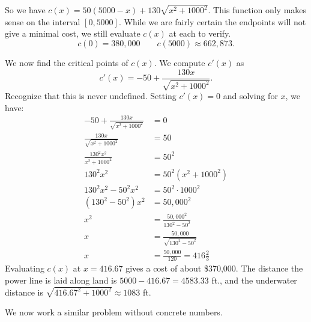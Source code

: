 \documentclass{ximera}
\begin{document}
\begin{example}
\begin{explanation}
    So we have $c(x) = 50(5000-x)+ 130\sqrt{x^2+1000^2}$. This function
    only makes sense on the interval $[0,5000]$. While we are fairly
    certain the endpoints will not give a minimal cost, we still evaluate
    $c(x)$ at each to verify.
    \[
    c(0) = 380,000 \quad\quad c(5000) \approx 662,873.
    \]
    
    We now find the critical points of $c(x)$. We compute $c'(x)$ as
    \[
    c'(x) = -50+\frac{130x}{\sqrt{x^2+1000^2}}.
    \]
    Recognize that this is never undefined. Setting $c'(x)=0$ and solving
    for $x$, we have:
    \begin{align*}
      -50+\frac{130x}{\sqrt{x^2+1000^2}} &= 0 \\
      \frac{130x}{\sqrt{x^2+1000^2}}  &= 50\\
      \frac{130^2x^2}{x^2+1000^2} &= 50^2\\
      130^2x^2 &= 50^2(x^2+1000^2) \\
      130^2x^2-50^2x^2 &= 50^2\cdot1000^2\\
      (130^2-50^2)x^2 &= 50,000^2\\
      x^2 &= \frac{50,000^2}{130^2-50^2}\\
      x &= \frac{50,000}{\sqrt{130^2-50^2}}\\
      x & = \frac{50,000}{120} =416\frac23
    \end{align*}
    Evaluating $c(x)$ at $x=416.67$ gives a cost of about \$370,000. The
    distance the power line is laid along land is $5000-416.67 = 4583.33$
    ft., and the underwater distance is $\sqrt{416.67^2+1000^2} \approx
    1083$ ft.
  \end{explanation}
\end{example}




We now work a similar problem without concrete numbers.
\end{document}
